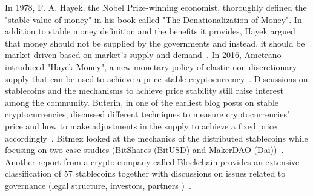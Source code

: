 In 1978, F. A. Hayek, the Nobel Prize-winning economist, thoroughly defined the "stable value of money" in his book called "The Denationalization of Money". In addition to stable money definition and the benefits it provides, Hayek argued that money should not be supplied by the governments and instead, it should be market driven \ie based on market's supply and demand~\cite{F. A. Hayek}. In 2016, Ametrano introduced "Hayek Money", a new monetary policy of elastic non-discretionary supply that can be used to achieve a price stable cryptocurrency~\cite{ametrano2016hayek}. Discussions on stablecoins and the mechanisms to achieve price stability still raise interest among the community. Buterin, in one of the earliest blog posts on stable cryptocurrencies, discussed different techniques to measure cryptocurrencies' price and how to make adjustments in the supply to achieve a fixed price accordingly~\cite{TheSearc7:online}. Bitmex looked at the mechanics of the distributed stablecoins while focusing on two case studies (\ie BitShares (BitUSD) and MakerDAO (Dai))~\cite{bitmex}. Another report from a crypto company called Blockchain provides an extensive classification of 57 stablecoins together with discussions on issues related to governance (\eg legal structure, investors, partners \etc)~\cite{report}. 






 
 






